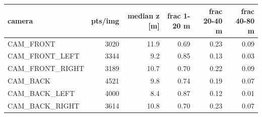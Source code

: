 \footnotesize\renewcommand{\arraystretch}{0.92}
\begin{tabular}{lrrrrr}
\toprule
camera & pts/img & median z [m] & frac 1-20 m & frac 20-40 m & frac 40-80 m \\
\midrule
CAM\_FRONT & 3020 & 11.9 & 0.69 & 0.23 & 0.09 \\
CAM\_FRONT\_LEFT & 3344 & 9.2 & 0.85 & 0.13 & 0.03 \\
CAM\_FRONT\_RIGHT & 3189 & 10.7 & 0.70 & 0.22 & 0.09 \\
CAM\_BACK & 4521 & 9.8 & 0.74 & 0.19 & 0.07 \\
CAM\_BACK\_LEFT & 4000 & 8.4 & 0.87 & 0.12 & 0.01 \\
CAM\_BACK\_RIGHT & 3614 & 10.8 & 0.70 & 0.23 & 0.07 \\
\bottomrule
\end{tabular}
